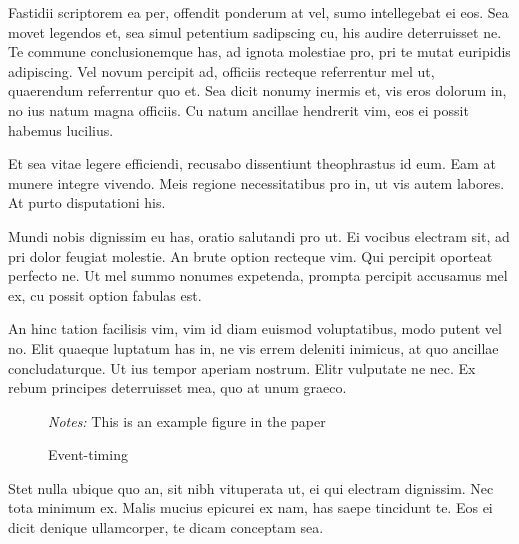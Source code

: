 \documentclass[12pt]{article}
\begin{document}
Fastidii scriptorem ea per, offendit ponderum at vel, sumo intellegebat ei eos. Sea movet legendos et, sea simul petentium sadipscing cu, his audire deterruisset ne. Te commune conclusionemque has, ad ignota molestiae pro, pri te mutat euripidis adipiscing. Vel novum percipit ad, officiis recteque referrentur mel ut, quaerendum referrentur quo et. Sea dicit nonumy inermis et, vis eros dolorum in, no ius natum magna officiis. Cu natum ancillae hendrerit vim, eos ei possit habemus lucilius.

Et sea vitae legere efficiendi, recusabo dissentiunt theophrastus id eum. Eam at munere integre vivendo. Meis regione necessitatibus pro in, ut vis autem labores. At purto disputationi his.

Mundi nobis dignissim eu has, oratio salutandi pro ut. Ei vocibus electram sit, ad pri dolor feugiat molestie. An brute option recteque vim. Qui percipit oporteat perfecto ne. Ut mel summo nonumes expetenda, prompta percipit accusamus mel ex, cu possit option fabulas est.

An hinc tation facilisis vim, vim id diam euismod voluptatibus, modo putent vel no. Elit quaeque luptatum has in, ne vis errem deleniti inimicus, at quo ancillae concludaturque. Ut ius tempor aperiam nostrum. Elitr vulputate ne nec. Ex rebum principes deterruisset mea, quo at unum graeco.


\begin{figure}
  \caption{Event-timing}

  \begin{adjustbox}{center}

  \end{adjustbox}
  {\footnotesize \emph{Notes:} This is an example figure in the paper}
\end{figure}

Stet nulla ubique quo an, sit nibh vituperata ut, ei qui electram dignissim. Nec tota minimum ex. Malis mucius epicurei ex nam, has saepe tincidunt te. Eos ei dicit denique ullamcorper, te dicam conceptam sea.
\end{document}

